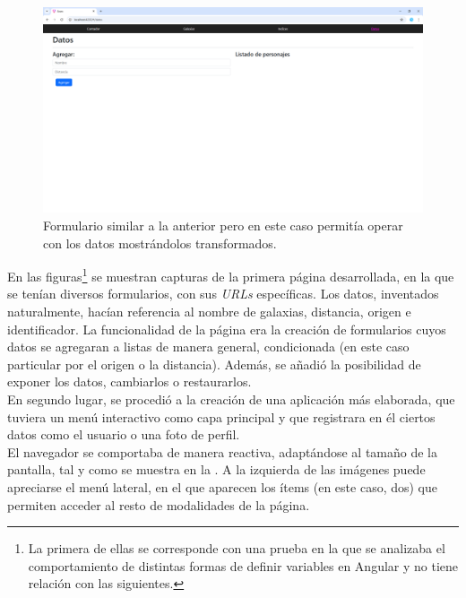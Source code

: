\begin{figure}[H]
    \centering
    \includegraphics[width=0.8\linewidth]{figuras/pag4.png}
    \caption{Formulario similar a la anterior pero en este caso permitía operar con los datos mostrándolos transformados.}
    \label{pag4}
\end{figure}

En las figuras\footnote{La primera de ellas se corresponde con una prueba en la que se analizaba el comportamiento de distintas formas de definir variables en Angular y no tiene relación con las siguientes.} se muestran capturas de la primera página desarrollada, en la que se tenían diversos formularios, con sus \textit{URLs} específicas. Los datos, inventados naturalmente, hacían referencia al nombre de galaxias, distancia, origen e identificador. La funcionalidad de la página era la creación de formularios cuyos datos se agregaran a listas de manera general, condicionada (en este caso particular por el origen o la distancia). Además, se añadió la posibilidad de exponer los datos, cambiarlos o restaurarlos.\\

En segundo lugar, se procedió a la creación de una aplicación más elaborada, que tuviera un menú interactivo como capa principal y que registrara en él ciertos datos como el usuario o una foto de perfil.\\

El navegador se comportaba de manera reactiva, adaptándose al tamaño de la pantalla, tal y como se muestra en la . A la izquierda de las imágenes puede apreciarse el menú lateral, en el que aparecen los ítems (en este caso, dos) que permiten acceder al resto de modalidades de la página.

